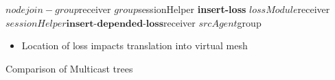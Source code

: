 \documentclass[landscape]{foils}
\begin{document}

\begin{comment}
\item notice direct e2e transfer
\item virtual link processing makes this possible
\item creating loss through lossModules
\end{comment}

\begin{program}\small
  $node join-group $receiver $group
  
  $sessionHelper \textbf{insert-loss} $lossModule $receiver
  $sessionHelper \textbf{insert-depended-loss} $receiver $srcAgent $group
\end{program}


\begin{itemize}
\item Location of loss impacts translation into virtual mesh
\end{itemize}

\begin{comment}
\item Loss modules are created from the loss models separately
\item Loss modules would be attached to the link.
\item translating them to virtual topology is done, but implementation
  is not in yet.
\end{comment}

Comparison of Multicast trees

\begin{minipage}{0.5\linewidth}
\end{minipage}
\begin{minipage}{0.5\linewidth}
\end{minipage}

\begin{comment}
\item 4 node topology, 1 source 3 receivers
\end{comment}
\end{document}
